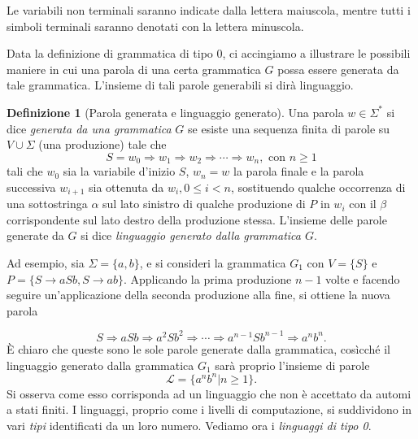 \documentclass[10pt]{\classname}
\theoremstyle{newlinethm}
\theoremstyle{theorem}
\theoremstyle{definition}
\newtheorem{definizione}{Definizione}[section]
\theoremstyle{definition}
\theoremstyle{definition}
\theoremstyle{definition}
\begin{document}
Le variabili non terminali saranno indicate dalla lettera maiuscola, mentre
tutti i simboli terminali saranno denotati con la lettera minuscola.

Data la definizione di grammatica di tipo 0, ci accingiamo a illustrare le
possibili maniere in cui una parola di una certa grammatica $G$ possa essere
generata da tale grammatica. L'insieme di tali parole generabili si dirà
linguaggio.

\begin{definizione}[Parola generata e linguaggio generato]
    Una parola $w \in \Sigma^*$ si dice \emph{generata da una grammatica} $G$ se esiste una sequenza finita di parole su $V \cup \Sigma$ (una produzione) tale che $$S = w_0 \Rightarrow w_1 \Rightarrow w_2 \Rightarrow \cdots \Rightarrow w_n, \mbox{ con } n \geq 1$$ tali che $w_0$ sia la variabile d'inizio $S$, $w_n = w$ la parola finale e la parola successiva $w_{i+1}$ sia ottenuta da $w_i, 0 \leq i < n$, sostituendo qualche occorrenza di una sottostringa $\alpha$ sul lato sinistro di qualche produzione di $P$ in $w_i$ con il $\beta$ corrispondente sul lato destro della produzione stessa. L'insieme delle parole generate da $G$ si dice \emph{linguaggio generato dalla grammatica $G$}.
\end{definizione}

Ad esempio, sia $\Sigma = \{a, b\}$, e si consideri la grammatica $G_1$ con $V
= \{S\}$ e $P = \{S \rightarrow aSb, S \rightarrow ab\}.$ Applicando la prima
produzione $n-1$ volte e facendo seguire un'applicazione della seconda
produzione alla fine, si ottiene la nuova parola

$$S \Rightarrow aSb \Rightarrow a^2Sb^2 \Rightarrow \cdots \Rightarrow
a^{n-1}Sb^{n-1} \Rightarrow a^{n}b^{n}.$$ È chiaro che queste sono le sole
parole generate dalla grammatica, cosìcché il linguaggio generato dalla
grammatica $G_1$ sarà proprio l'insieme di parole \[\mathcal L = \{a^n b^n | n\geq 1\}.\] Si osserva come esso corrisponda ad un linguaggio che non è accettato da automi a stati finiti. I linguaggi, proprio come i livelli di computazione, si suddividono in vari \emph{tipi} identificati da un loro numero. Vediamo ora i \emph{linguaggi di tipo 0}.
\end{document}
